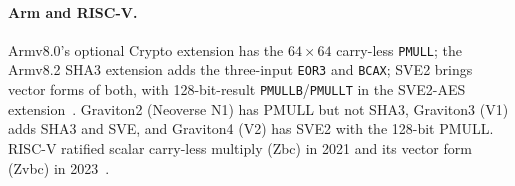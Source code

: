 \paragraph{Arm and RISC-V.} Armv8.0's optional Crypto extension has the
$64\times64$ carry-less \texttt{PMULL}; the Armv8.2 SHA3 extension adds the
three-input \texttt{EOR3} and \texttt{BCAX}; SVE2 brings vector forms of
both, with 128-bit-result \texttt{PMULLB}/\texttt{PMULLT} in the SVE2-AES
extension~\cite{arm_a64_2026}. Graviton2 (Neoverse N1) has PMULL but not
SHA3, Graviton3 (V1) adds SHA3 and SVE, and Graviton4 (V2) has SVE2 with
the 128-bit PMULL.
RISC-V ratified scalar carry-less multiply (Zbc) in 2021 and its vector
form (Zvbc) in 2023~\cite{riscv_bitmanip,riscv_vcrypto}.


